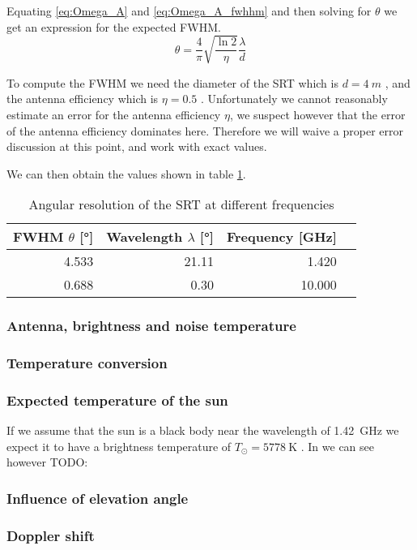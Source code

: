 Equating \eqref{eq:Omega_A} and \eqref{eq:Omega_A_fwhhm} and then solving for $\theta$ we get an expression for the expected FWHM.
\begin{equation}
    \theta = \frac{4}{\pi} \sqrt{\frac{\ln{2}}{\eta}}\frac{\lambda}{d} \label{eq:fwhm}
\end{equation}

To compute the FWHM we need the diameter of the SRT which is $d = \SI{4}{m}$ \cite[p. 4]{srt}, and the antenna efficiency which is $\eta = 0.5$ \cite[p. 2]{srt}.
Unfortunately we cannot reasonably estimate an error for the antenna efficiency $\eta$, we suspect however that the error of the antenna efficiency dominates here.
Therefore we will waive a proper error discussion at this point, and work with exact values.

We can then obtain the values shown in table \ref{tab:ang_res}.
\begin{table}[H]
    \centering
    \begin{tabular}{rrrr}
        \toprule
        FWHM $\theta$ [\si{\degree}] & Wavelength $\lambda$ [\si{\degree}] & Frequency [\si{\giga \hertz}]\\
        \midrule
        \num{4.533} & \num{21.11} & \num{1.420}\\
        \num{0.688} & \num{0.30} & \num{10.000}\\
        \bottomrule
    \end{tabular}
    \caption{Angular resolution of the SRT at different frequencies}
    \label{tab:ang_res}
\end{table}
\subsubsection{Antenna, brightness and noise temperature}

\subsubsection{Temperature conversion}

\subsubsection{Expected temperature of the sun}\label{sec:temp}
If we assume that the sun is a black body near the wavelength of \SI{1.42}{\giga\hertz} we expect it to have a brightness temperature of $T_{\odot} = \SI{5778}{\kelvin}$ \cite[p. 211]{durandi_formeln_2011}.
In \cite[p.8-45 fig. 8-34]{kraus_radio_1986} we can see however TODO:

\subsubsection{Influence of elevation angle}


\subsubsection{Doppler shift}